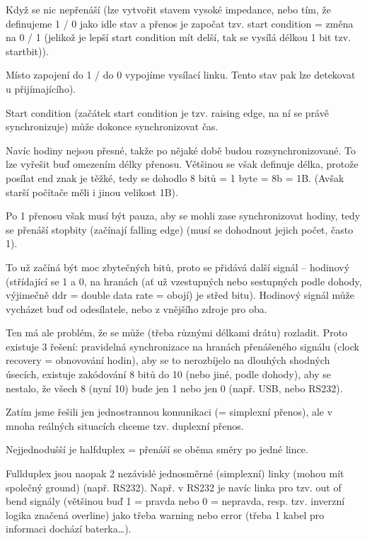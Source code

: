 \documentclass[12pt]{article}					%
\begin{document}
        \begin{definice}
                Když se nic nepřenáší (lze vytvořit stavem vysoké impedance, nebo tím, že definujeme 1 / 0 jako idle stav a přenos je započat  tzv. start condition = změna na 0 / 1 (jelikož je lepší start condition mít delší, tak se vysílá délkou 1 bit tzv. startbit)).
            \begin{definice}[stav Vysoké impedance = high Z]
                Místo zapojení do 1 / do 0 vypojíme vysílací linku. Tento stav pak lze detekovat u přijímajícího).
            \end{definice}
        \end{definice}

        \begin{poznamka}
             Start condition (začátek start condition je tzv. raising edge, na ní se právě synchronizuje) může dokonce synchronizovat čas.

             Navíc hodiny nejsou přesné, takže po nějaké době budou rozsynchronizované. To lze vyřešit buď omezením délky přenosu. Většinou se však definuje délka, protože posílat end znak je těžké, tedy se dohodlo 8 bitů = 1 byte = 8b = 1B. (Avšak starší počítače měli i jinou velikost 1B).

             Po 1 přenosu však musí být pauza, aby se mohli zase synchronizovat hodiny, tedy se přenáší stopbity (začínají falling edge) (musí se dohodnout jejich počet, často 1).

             To už začíná být moc zbytečných bitů, proto se přidává další signál -- hodinový (střídající se 1 a 0, na hranách (ať už vzestupných nebo sestupných podle dohody, výjimečně ddr = double data rate = obojí) je střed bitu). Hodinový signál může vycházet buď od odesílatele, nebo z vnějšího zdroje pro oba.

             Ten má ale problém, že se může (třeba různými délkami drátu) rozladit. Proto existuje 3 řešení: pravidelná synchronizace na hranách přenášeného signálu (clock recovery = obnovování hodin), aby se to nerozbíjelo na dlouhých shodných úsecích, existuje zakódování 8 bitů do 10 (nebo jiné, podle dohody), aby se nestalo, že všech 8 (nyní 10) bude jen 1 nebo jen 0 (např. USB, nebo RS232).
        \end{poznamka}

        \begin{poznamka}
            Zatím jsme řešili jen jednostrannou komunikaci (= simplexní přenos), ale v mnoha reálných situacích chceme tzv. duplexní přenos.

            Nejjednodušší je halfduplex = přenáší se oběma směry po jedné lince.

            Fullduplex jsou naopak 2 nezávislé jednosměrné (simplexní) linky (mohou mít společný ground) (např. RS232). Např. v RS232 je navíc linka pro tzv. out of bend signály (většinou buď 1 = pravda nebo 0 = nepravda, resp. tzv. inverzní logika značená overline) jako třeba warning nebo error (třeba 1 kabel pro informaci dochází baterka…).
        \end{poznamka}
\end{document}

